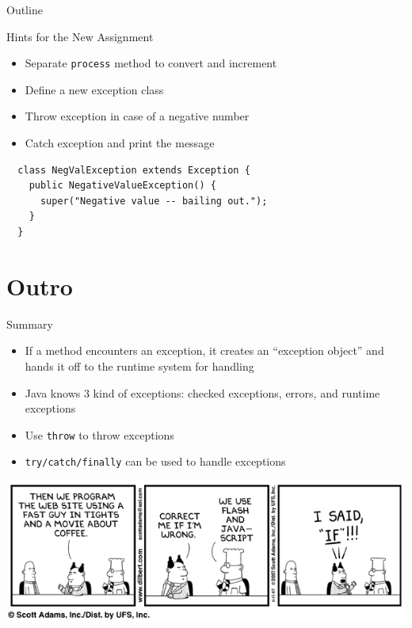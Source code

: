 \begin{frame}{Outline}
  \tableofcontents[current]
\end{frame}

\begin{frame}[fragile]{Hints for the New Assignment}
  \begin{itemize}
  \item Separate \lstinline!process! method to convert and increment
  \item Define a new exception class
  \item Throw exception in case of a negative number
  \item Catch exception and print the message
  \end{itemize}


  \begin{lstlisting}
  class NegValException extends Exception {
    public NegativeValueException() {
      super("Negative value -- bailing out.");
    }
  }      
  \end{lstlisting}
\end{frame}


\section*{Outro}

\begin{frame}{Summary}
  \begin{itemize}
  \item If a method encounters an exception, it creates an ``exception
    object'' and hands it off to the runtime system for handling
  \item Java knows 3 kind of exceptions: checked exceptions, errors,
    and runtime exceptions
  \item Use \lstinline{throw} to throw exceptions
  \item \lstinline{try/catch/finally} can be used to handle exceptions
  \end{itemize}


  \begin{center}
    \includegraphics[scale=0.45]{figures/dilbert-2}
  \end{center}
\end{frame}


